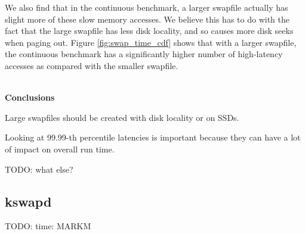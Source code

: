 \documentclass[twocolumn,11pt]{article}
\begin{document}
We also find that in the continuous benchmark, a larger swapfile actually has
slight more of these slow memory accesses. We believe this has to do with the
fact that the large swapfile has less disk locality, and so causes more disk
seeks when paging out. Figure \ref{fig:swap_time_cdf} shows that with a larger
swapfile, the continuous benchmark has a significantly higher number of
high-latency accesses as compared with the smaller swapfile.

~\\ \textbf{Conclusions} 

Large swapfiles should be created with disk locality or on SSDs.

Looking at 99.99-th percentile latencies is important because they can have a
lot of impact on overall run time.

TODO: what else?

\subsection{kswapd}

TODO: time: MARKM

{}

\end{document}
